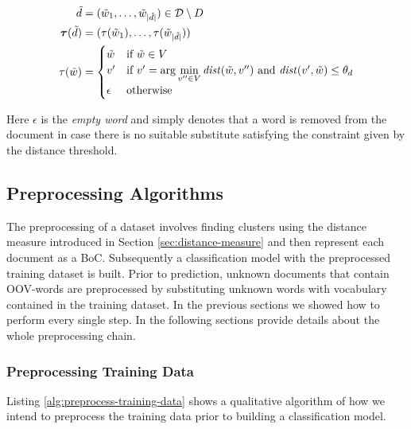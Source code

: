 \begin{equation*}
\begin{split}
	\tilde{d} &= (\tilde{w}_1, \ldots, \tilde{w}_{|\tilde{d}|}) \in
	\mathcal{D}\setminus D \\	
	\boldsymbol\tau(\tilde{d}) &= (\tau(\tilde{w}_1), \ldots,
	\tau(\tilde{w}_{|\tilde{d}|})) \\	
	\tau(\tilde{w}) &= \begin{cases} \tilde{w} & \text{if~} \tilde{w} \in V \\ v' &
	\text{if~} v' = \arg\min\limits_{v''\in V}\mathit{dist}(\tilde{w},v'') 
	\text{~and~} \mathit{dist}(v',\tilde{w}) \leq \theta_d \\ \epsilon
	& \text{otherwise}
	\end{cases}	
\end{split} 
\end{equation*}

Here $\epsilon$ is the \emph{empty word} and simply denotes that a word is removed
from the document in case there is no suitable substitute satisfying the
constraint given by the distance threshold.

\subsection{Preprocessing Algorithms}
\label{ssec:preprocessing-algorithms}
The preprocessing of a dataset involves finding clusters using the distance
measure introduced in Section \ref{sec:distance-measure} and then represent each
document as a BoC. Subsequently a classification model with the preprocessed
training dataset is built. Prior to prediction, unknown documents that contain
OOV-words are preprocessed by substituting unknown words with vocabulary
contained in the training dataset. In the previous sections we showed how to
perform every single step. In the following sections provide details about the
whole preprocessing chain.

\subsubsection{Preprocessing Training Data}

Listing \ref{alg:preprocess-training-data} shows a qualitative algorithm of
how we intend to preprocess the training data prior to building a
classification model. 


